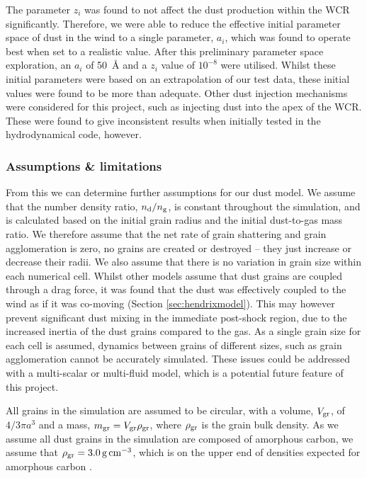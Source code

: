 The parameter $z_i$ was found to not affect the dust production within the WCR significantly.
Therefore, we were able to reduce the effective initial parameter space of dust in the wind to a single parameter, $a_i$, which was found to operate best when set to a realistic value.
After this preliminary parameter space exploration, an $a_i$ of \SI{50}{\angstrom} and a $z_i$ value of $10^{-8}$ were utilised.
Whilst these initial parameters were based on an extrapolation of our test data, these initial values were found to be more than adequate.
Other dust injection mechanisms were considered for this project, such as injecting dust into the apex of the WCR.
These were found to give inconsistent results when initially tested in the \mg{} hydrodynamical code, however.

\subsubsection{Assumptions \& limitations}
\label{sec:bidmasassumptions}
\label{sec:bidmaslimitations}

From this we can determine further assumptions for our dust model.
We assume that the number density ratio, $n_\text{d}/n_\text{g}$, is constant throughout the simulation, and is calculated based on the initial grain radius and the initial dust-to-gas mass ratio.
We therefore assume that the net rate of grain shattering and grain agglomeration is zero, no grains are created or destroyed -- they just increase or decrease their radii.
We also assume that there is no variation in grain size within each numerical cell.
Whilst other models assume that dust grains are coupled through a drag force, it was found that the dust was effectively coupled to the wind as if it was co-moving (Section \ref{sec:hendrixmodel}).
This may however prevent significant dust mixing in the immediate post-shock region, due to the increased inertia of the dust grains compared to the gas.
As a single grain size for each cell is assumed, dynamics between grains of different sizes, such as grain agglomeration cannot be accurately simulated.
These issues could be addressed with a multi-scalar or multi-fluid model, which is a potential future feature of this project.

All grains in the simulation are assumed to be circular, with a volume, $V_\text{gr}$, of $4/3 \pi a^3$ and a mass, $m_\text{gr} = V_\text{gr} \rho_\text{gr}$, where $\rho_\text{gr}$ is the grain bulk density.
As we assume all dust grains in the simulation are composed of amorphous carbon, we assume that $\rho_\text{gr} = \SI{3.0}{g.cm^{-3}}$, which is on the upper end of densities expected for amorphous carbon
\parencite{bhattaraiEvolutionAmorphousCarbon2018}.

